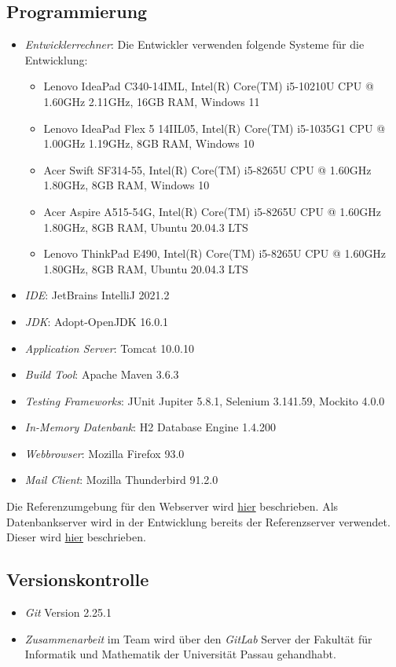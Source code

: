 \subsection{Programmierung}
\begin{itemize}
	\item \emph{Entwicklerrechner}: Die Entwickler verwenden folgende Systeme für die Entwicklung:
		\begin{itemize}
			\item Lenovo IdeaPad C340-14IML, Intel(R) Core(TM) i5-10210U CPU @ 1.60GHz 2.11GHz, 16GB RAM, Windows 11
			\item Lenovo IdeaPad Flex 5 14IIL05, Intel(R) Core(TM) i5-1035G1 CPU @ 1.00GHz 1.19GHz, 8GB RAM, Windows 10
			\item Acer Swift SF314-55, Intel(R) Core(TM) i5-8265U CPU @ 1.60GHz 1.80GHz, 8GB RAM, Windows 10
			\item Acer Aspire A515-54G, Intel(R) Core(TM) i5-8265U CPU @ 1.60GHz 1.80GHz, 8GB RAM, Ubuntu 20.04.3 LTS
			\item Lenovo ThinkPad E490, Intel(R) Core(TM) i5-8265U CPU @ 1.60GHz 1.80GHz, 8GB RAM, Ubuntu 20.04.3 LTS
		\end{itemize}
	\item \emph{IDE}: JetBrains IntelliJ 2021.2
	\item \emph{JDK}: Adopt-OpenJDK 16.0.1
	\item \emph{Application Server}: Tomcat 10.0.10
	\item \emph{Build Tool}: Apache Maven 3.6.3
	\item \emph{Testing Frameworks}: JUnit Jupiter 5.8.1, Selenium 3.141.59, Mockito 4.0.0
	\item \emph{In-Memory Datenbank}: H2 Database Engine 1.4.200
	\item \emph{Webbrowser}: Mozilla Firefox 93.0
	\item \emph{Mail Client}: Mozilla Thunderbird 91.2.0
\end{itemize}
Die Referenzumgebung für den Webserver wird \hyperref[spezi]{hier} beschrieben.
Als Datenbankserver wird in der Entwicklung bereits der Referenzserver verwendet. Dieser wird \hyperref[dbspezi]{hier} beschrieben.
\subsection{Versionskontrolle}
\begin{itemize}
	\item \emph{Git} Version 2.25.1
	\item \emph{Zusammenarbeit} im Team wird über den \emph{GitLab} Server der Fakultät für Informatik und Mathematik der Universität Passau gehandhabt.
\end{itemize}
